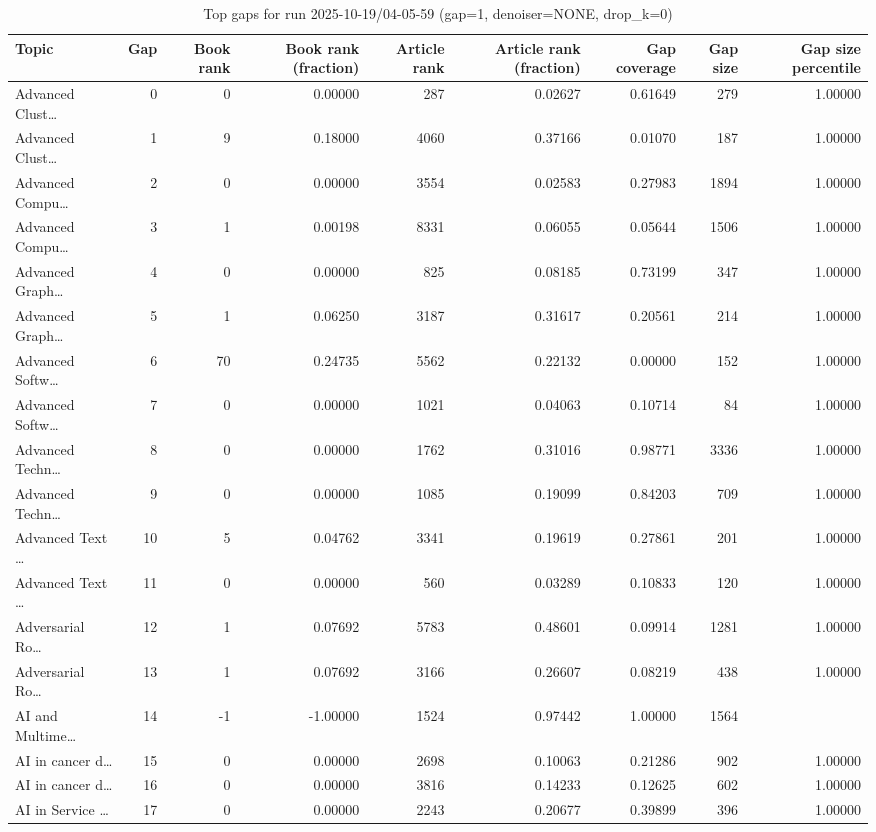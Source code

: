 \begin{table}
\caption{Top gaps for run 2025-10-19/04-05-59 (gap=1, denoiser=NONE, drop\_k=0)}
\label{tab:best_run_gap1_2025_10_19_04_05_59}
\begin{tabular}{lrrrrrrrr}
\toprule
Topic & Gap & Book rank & Book rank (fraction) & Article rank & Article rank (fraction) & Gap coverage & Gap size & Gap size percentile \\
\midrule
Advanced Clust… & 0 & 0 & 0.00000 & 287 & 0.02627 & 0.61649 & 279 & 1.00000 \\
Advanced Clust… & 1 & 9 & 0.18000 & 4060 & 0.37166 & 0.01070 & 187 & 1.00000 \\
Advanced Compu… & 2 & 0 & 0.00000 & 3554 & 0.02583 & 0.27983 & 1894 & 1.00000 \\
Advanced Compu… & 3 & 1 & 0.00198 & 8331 & 0.06055 & 0.05644 & 1506 & 1.00000 \\
Advanced Graph… & 4 & 0 & 0.00000 & 825 & 0.08185 & 0.73199 & 347 & 1.00000 \\
Advanced Graph… & 5 & 1 & 0.06250 & 3187 & 0.31617 & 0.20561 & 214 & 1.00000 \\
Advanced Softw… & 6 & 70 & 0.24735 & 5562 & 0.22132 & 0.00000 & 152 & 1.00000 \\
Advanced Softw… & 7 & 0 & 0.00000 & 1021 & 0.04063 & 0.10714 & 84 & 1.00000 \\
Advanced Techn… & 8 & 0 & 0.00000 & 1762 & 0.31016 & 0.98771 & 3336 & 1.00000 \\
Advanced Techn… & 9 & 0 & 0.00000 & 1085 & 0.19099 & 0.84203 & 709 & 1.00000 \\
Advanced Text … & 10 & 5 & 0.04762 & 3341 & 0.19619 & 0.27861 & 201 & 1.00000 \\
Advanced Text … & 11 & 0 & 0.00000 & 560 & 0.03289 & 0.10833 & 120 & 1.00000 \\
Adversarial Ro… & 12 & 1 & 0.07692 & 5783 & 0.48601 & 0.09914 & 1281 & 1.00000 \\
Adversarial Ro… & 13 & 1 & 0.07692 & 3166 & 0.26607 & 0.08219 & 438 & 1.00000 \\
AI and Multime… & 14 & -1 & -1.00000 & 1524 & 0.97442 & 1.00000 & 1564 &  \\
AI in cancer d… & 15 & 0 & 0.00000 & 2698 & 0.10063 & 0.21286 & 902 & 1.00000 \\
AI in cancer d… & 16 & 0 & 0.00000 & 3816 & 0.14233 & 0.12625 & 602 & 1.00000 \\
AI in Service … & 17 & 0 & 0.00000 & 2243 & 0.20677 & 0.39899 & 396 & 1.00000 \\

\end{tabular}
\end{table}
